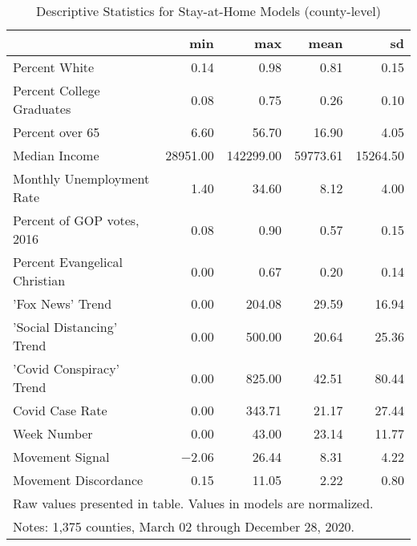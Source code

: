 \begin{table}[!ht]

\caption{\label{tab:google-desc-table}Descriptive Statistics for Stay-at-Home Models (county-level)}
\centering
\begin{tabular}{lrrrr}
\toprule
  & min & max & mean & sd\\
\midrule
Percent White & \num{0.14} & \num{0.98} & \num{0.81} & \num{0.15}\\
Percent College Graduates & \num{0.08} & \num{0.75} & \num{0.26} & \num{0.10}\\
Percent over 65 & \num{6.60} & \num{56.70} & \num{16.90} & \num{4.05}\\
Median Income & \num{28951.00} & \num{142299.00} & \num{59773.61} & \num{15264.50}\\
Monthly Unemployment Rate & \num{1.40} & \num{34.60} & \num{8.12} & \num{4.00}\\
Percent of GOP votes, 2016 & \num{0.08} & \num{0.90} & \num{0.57} & \num{0.15}\\
Percent Evangelical Christian & \num{0.00} & \num{0.67} & \num{0.20} & \num{0.14}\\
'Fox News' Trend & \num{0.00} & \num{204.08} & \num{29.59} & \num{16.94}\\
'Social Distancing' Trend & \num{0.00} & \num{500.00} & \num{20.64} & \num{25.36}\\
'Covid Conspiracy' Trend & \num{0.00} & \num{825.00} & \num{42.51} & \num{80.44}\\
Covid Case Rate & \num{0.00} & \num{343.71} & \num{21.17} & \num{27.44}\\
Week Number & \num{0.00} & \num{43.00} & \num{23.14} & \num{11.77}\\
Movement Signal & \num{-2.06} & \num{26.44} & \num{8.31} & \num{4.22}\\
Movement Discordance & \num{0.15} & \num{11.05} & \num{2.22} & \num{0.80}\\
\bottomrule
\multicolumn{5}{l}{\rule{0pt}{1em}Raw values presented in table. Values in models are normalized.}\\
\multicolumn{5}{l}{\rule{0pt}{1em}Notes: 1,375 counties, March 02 through December 28, 2020.}\\
\end{tabular}
\end{table}